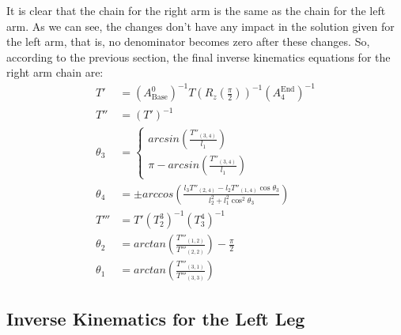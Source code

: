 It is clear that the chain for the right arm is the same as the chain for the left arm. 
As we can see, the changes don't have any impact in the solution given for the left arm, that is, no denominator becomes zero after these changes. So, according to the previous section, the final inverse kinematics equations for the right arm chain are:
\begin{align*}
T' &= \left(A_\text{Base}^0\right)^{-1}T\left(R_z(\tfrac{\pi}{2})\right)^{-1}\left(A_4^\text{End}\right)^{-1}\\
T'' &= \left(T'\right)^{-1}\\
\theta_3 &= \left\{
	\begin{array}{l}
	arcsin\left(\frac{T''_{(3,4)}}{l_1}\right)\\
	\pi-arcsin\left(\frac{T''_{(3,4)}}{l_1}\right)
	\end{array} \right.\\
\theta_4 &= \pm arccos\left( \frac{l_3 T''_{(2,4)} - l_2T''_{(1,4)}\cos\theta_3}{l_2^2+l_1^2\cos^2\theta_3} \right)\\
T''' &= T'\left(T_2^3\right)^{-1}\left(T_3^4\right)^{-1}\\
\theta_2 &= arctan\left(\frac{T'''_{(1,2)}}{T'''_{(2,2)}}\right)-\frac{\pi}{2}\\
\theta_1 &= arctan\left(\frac{T'''_{(3,1)}}{T'''_{(3,3)}}\right)
\end{align*}





\subsection{Inverse Kinematics for the Left Leg}
\label{invleftleg}

